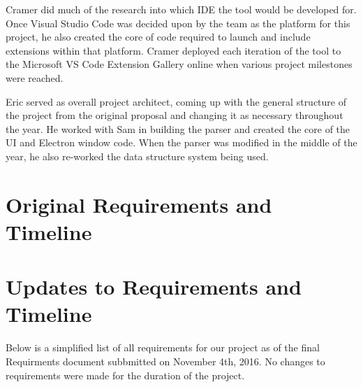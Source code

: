 \documentclass[letterpaper,10pt,titlepage,draftclsnofoot,onecolumn,onesided] {IEEEtran}
\begin{document}
Cramer did much of the research into which IDE the tool would be developed for. 
Once Visual Studio Code was decided upon by the team as the platform for this project, he also created the core of code required to launch and include extensions within that platform. 
Cramer deployed each iteration of the tool to the Microsoft VS Code Extension Gallery online when various project milestones were reached.

Eric served as overall project architect, coming up with the general structure of the project from the original proposal and changing it as necessary throughout the year. 
He worked with Sam in building the parser and created the core of the UI and Electron window code. 
When the parser was modified in the middle of the year, he also re-worked the data structure system being used.


\section{Original Requirements and Timeline}

\pagebreak
\section{Updates to Requirements and Timeline}
Below is a simplified list of all requirements for our project as of the final Requirments document subbmitted on November 4th, 2016. 
No changes to requirements were made for the duration of the project.
\end{document}

